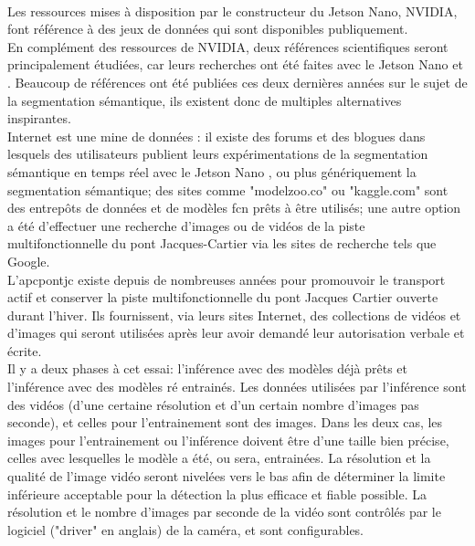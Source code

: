 ﻿\label{metho:data}
\vspace{\baselineskip}
\\
Les ressources mises à disposition par le constructeur du Jetson Nano, NVIDIA, font référence à des jeux de données qui sont disponibles publiquement.
\vspace{\baselineskip}
\\
\noindent En complément des ressources de NVIDIA, deux références scientifiques seront principalement étudiées, car leurs recherches ont été faites avec le Jetson Nano \parencite{nguyen_mavnet_2019} et \parencite{chong_real-time_1992}. Beaucoup de références ont été publiées ces deux dernières années sur le sujet de la segmentation sémantique, ils existent donc de multiples alternatives inspirantes.
\vspace{\baselineskip}
\\
\noindent Internet est une mine de données : il existe des forums et des blogues dans lesquels des utilisateurs publient leurs expérimentations de la segmentation sémantique en temps réel avec le Jetson Nano \parencite{dustin_realtime_2019}, ou plus génériquement la segmentation sémantique; des sites comme "modelzoo.co" ou "kaggle.com" sont des entrepôts de données et de modèles \acrshort{fcn} prêts à être utilisés; une autre option a été d'effectuer une recherche d'images ou de vidéos de la piste multifonctionnelle du pont Jacques-Cartier via les sites de recherche tels que Google. 
\vspace{\baselineskip}
\\
\noindent L'\acrlong{apcpontjc} existe depuis de nombreuses années pour promouvoir le transport actif et conserver la piste multifonctionnelle du pont Jacques Cartier ouverte durant l'hiver. Ils fournissent, via leurs sites Internet, des collections de vidéos et d'images qui seront utilisées après leur avoir demandé leur autorisation verbale et écrite. \parencite{association_des_pietons_et_cyclistes_du_pont_jacques-cartier_pontjacques-cartier365com_2020} \parencite{association_des_pietons_et_cyclistes_pont_jacques-cartier_flickr_2020}
\vspace{\baselineskip}
\\
Il y a deux phases à cet essai: l'inférence avec des modèles déjà prêts et l'inférence avec des modèles ré entrainés. Les données utilisées par l'inférence sont des vidéos (d'une certaine résolution et d'un certain nombre d'images pas seconde), et celles pour l'entrainement sont des images. Dans les deux cas, les images pour l'entrainement ou l'inférence doivent être d'une taille bien précise, celles avec lesquelles le modèle a été, ou sera, entrainées. La résolution et la qualité de l'image vidéo seront nivelées vers le bas afin de déterminer la limite inférieure acceptable pour la détection la plus efficace et fiable possible. La résolution et le nombre d'images par seconde de la vidéo sont contrôlés par le logiciel ("driver" en anglais) de la caméra, et sont configurables. 

